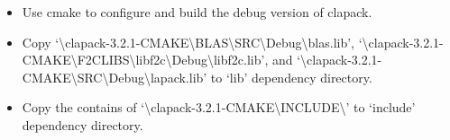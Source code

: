 \documentclass[a4paper,0pt,english]{sphinxmanual}
\begin{document}
\begin{itemize}
\begin{itemize}
\begin{itemize}
\item {} 
Use cmake to configure and build the debug version of clapack.

\item {} 
Copy `\textbackslash{}clapack-3.2.1-CMAKE\textbackslash{}BLAS\textbackslash{}SRC\textbackslash{}Debug\textbackslash{}blas.lib', `\textbackslash{}clapack-3.2.1-CMAKE\textbackslash{}F2CLIBS\textbackslash{}libf2c\textbackslash{}Debug\textbackslash{}libf2c.lib', and `\textbackslash{}clapack-3.2.1-CMAKE\textbackslash{}SRC\textbackslash{}Debug\textbackslash{}lapack.lib' to `lib' dependency directory.

\item {} 
Copy the contains of `\textbackslash{}clapack-3.2.1-CMAKE\textbackslash{}INCLUDE\textbackslash{}' to `include' dependency directory.

\end{itemize}

\end{itemize}

\end{itemize}
\end{document}
